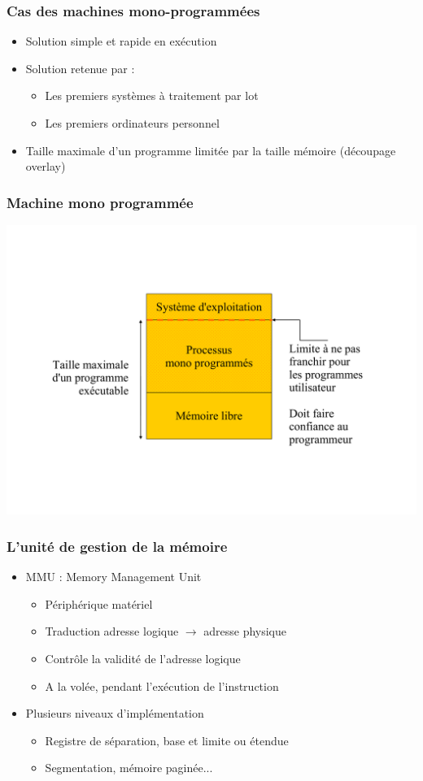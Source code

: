 \begin{frame}
\frametitle{Cas des machines mono-programmées}
\begin{itemize}
\item Solution simple et rapide en exécution
\item Solution retenue par :
\begin{itemize}
\item Les premiers systèmes à traitement par lot
\item Les premiers ordinateurs personnel
\end{itemize}
\item Taille maximale d'un programme limitée par la taille mémoire (découpage overlay)
\end{itemize}
\end{frame}


\begin{frame}
\frametitle{Machine mono programmée}
\includegraphics[width=.9\textwidth]{../illustration/memoire_principale_monoprogramme.pdf}
\end{frame}


\begin{frame}
\frametitle{L'unité de gestion de la mémoire}
\begin{itemize}
\item MMU : Memory Management Unit
\begin{itemize}
\item Périphérique matériel
\item Traduction adresse logique $\rightarrow$ adresse physique
\item Contrôle la validité de l'adresse logique
\item A la volée, pendant l'exécution de l'instruction
\end{itemize}
\item Plusieurs niveaux d'implémentation
\begin{itemize}
\item Registre de séparation, base et limite ou étendue
\item Segmentation, mémoire paginée...
\end{itemize}
\end{itemize}
\end{frame}



